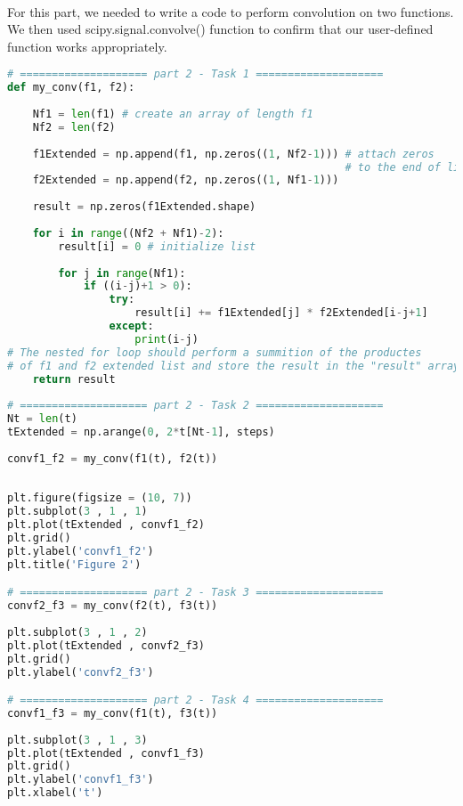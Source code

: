 \documentclass[12pt,a4paper]{article}
\begin{document}
\begin{itemize}
    \\For this part, we needed to write a code to perform convolution on two functions. We then used scipy.signal.convolve() function to confirm that our user-defined function works appropriately.

\begin{lstlisting}[language=Python, caption={User-defined convolution}, label={lst:code}, mathescape=true, breaklines=true]
# ==================== part 2 - Task 1 ====================
def my_conv(f1, f2):
    
    Nf1 = len(f1) # create an array of length f1
    Nf2 = len(f2)
     
    f1Extended = np.append(f1, np.zeros((1, Nf2-1))) # attach zeros 
                                                     # to the end of list of size Nf2
    f2Extended = np.append(f2, np.zeros((1, Nf1-1)))
     
    result = np.zeros(f1Extended.shape)
     
    for i in range((Nf2 + Nf1)-2):
        result[i] = 0 # initialize list
          
        for j in range(Nf1):
            if ((i-j)+1 > 0):
                try:
                    result[i] += f1Extended[j] * f2Extended[i-j+1]
                except:
                    print(i-j)
# The nested for loop should perform a summition of the productes  
# of f1 and f2 extended list and store the result in the "result" array.                      
    return result
    
# ==================== part 2 - Task 2 ====================
Nt = len(t)
tExtended = np.arange(0, 2*t[Nt-1], steps)         
 
convf1_f2 = my_conv(f1(t), f2(t))
 
 
plt.figure(figsize = (10, 7))
plt.subplot(3 , 1 , 1)
plt.plot(tExtended , convf1_f2)
plt.grid()
plt.ylabel('convf1_f2')
plt.title('Figure 2')

# ==================== part 2 - Task 3 ====================
convf2_f3 = my_conv(f2(t), f3(t))
 
plt.subplot(3 , 1 , 2)
plt.plot(tExtended , convf2_f3)
plt.grid()
plt.ylabel('convf2_f3')

# ==================== part 2 - Task 4 ====================
convf1_f3 = my_conv(f1(t), f3(t))
 
plt.subplot(3 , 1 , 3)
plt.plot(tExtended , convf1_f3)
plt.grid()
plt.ylabel('convf1_f3')
plt.xlabel('t')
\end{lstlisting}


\end{itemize}
\end{document}
